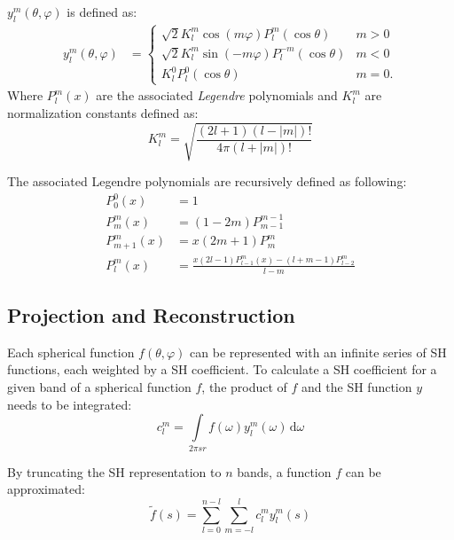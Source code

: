 \documentclass[thesis.tex]{subfiles}
\begin{document}
$y^m_l(\theta, \varphi)$ is defined as:
\begin{equation}
	\begin{alignedat}{2}
		y^m_l(\theta, \varphi) &= \begin{cases}
		\sqrt{2}K^m_l \cos(m\varphi) P^m_l(\cos\theta) & m>0\\
		\sqrt{2}K^m_l \sin(-m\varphi) P^{-m}_l(\cos\theta) & m<0\\
		K^0_l P^0_l(\cos\theta) & m=0.\end{cases}
	\end{alignedat}
\end{equation}
Where $P^m_l(x)$ are the associated \emph{Legendre} polynomials and $K^m_l$ are normalization constants defined as:
\begin{equation}
	K^m_l = \sqrt{\frac{(2l+1)(l-|m|)!}{4\pi(l+|m|)!}}
\end{equation}

The associated Legendre polynomials are recursively defined as following:
\begin{equation}
	\begin{alignedat}{2}
		P^0_0(x) &= 1\\
		P^m_m(x) &= (1-2m)P^{m-1}_{m-1}\\
		P^m_{m+1}(x) &= x(2m+1)P^m_m\\	
		P^m_l(x) &= \frac{x(2l-1)P^m_{l-1}(x)-(l+m-1)P^m_{l-2}}{l-m}
	\end{alignedat}
\end{equation}


\subsection{Projection and Reconstruction} \label{chap:shprojectrecon}
Each spherical function $f(\theta, \varphi)$ can be represented with an infinite series of SH functions, each weighted by a SH coefficient.
To calculate a SH coefficient for a given band of a spherical function $f$, the product of $f$ and the SH function $y$ needs to be integrated:
\begin{equation} \label{eq:shprojection}
	c^m_l=\int\limits_{2\pi sr} f(\omega)y^m_l(\omega)\, \mathrm{d}\omega
\end{equation}

By truncating the SH representation to $n$ bands, a function $f$ can be approximated:
\begin{equation}
	\widetilde{f}(s) = \sum_{l=0}^{n-l}\sum_{m=-l}^l c_l^m y_l^m(s)
\end{equation}
\end{document}

